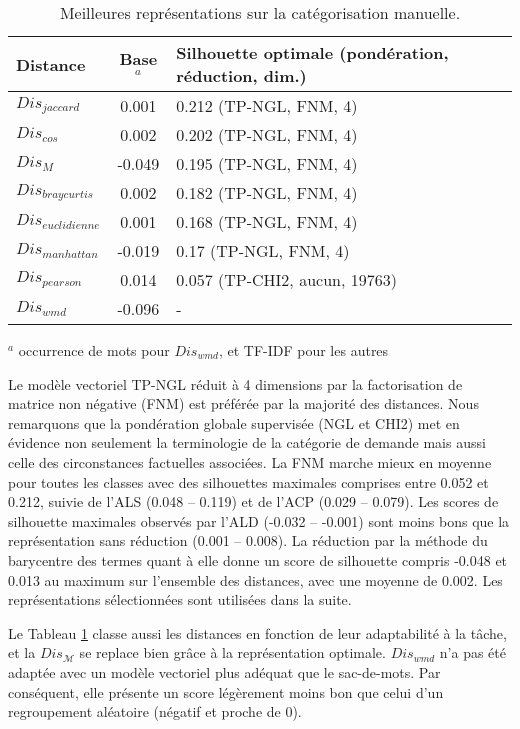 \begin{table}[!htb]
	\scriptsize \centering
	\begin{tabular}[pos]{|l|c|l|}
		\hline
		\textbf{Distance}&\textbf{Base$^a$}&\textbf{Silhouette optimale   (pondération, réduction, dim.)} \\ \hline
		$Dis_{jaccard}$ & 0.001 & 0.212 (TP-NGL, FNM, 4) \\ \hline
		$Dis_{cos}$ & 0.002 & 0.202 (TP-NGL, FNM, 4) \\ \hline
		$Dis_{M}$ & -0.049 & 0.195 (TP-NGL, FNM, 4) \\ \hline
		$Dis_{braycurtis}$ & 0.002& 0.182 (TP-NGL, FNM, 4) \\ \hline
		$Dis_{euclidienne}$ & 0.001& 0.168  (TP-NGL, FNM, 4) \\ \hline
		$Dis_{manhattan}$ & -0.019& 0.17   (TP-NGL, FNM, 4) \\ \hline
		$Dis_{pearson}$ & 0.014 & 0.057 (TP-CHI2, aucun, 19763) \\ \hline
		$Dis_{wmd}$ & -0.096 &  - \\ \hline
	\end{tabular}

	$^a$ occurrence de mots pour $Dis_{wmd}$, et TF-IDF pour les autres
    \caption{Meilleures représentations sur la catégorisation manuelle.} \label{tab:similarite:silhouette-vecteur-manuel}
\end{table}

 
Le modèle vectoriel TP-NGL réduit à 4 dimensions par la factorisation de matrice non négative (FNM) est préférée par la majorité des distances. Nous remarquons que la pondération globale supervisée (NGL et CHI2) met en évidence non seulement la terminologie de la catégorie de demande mais aussi celle des circonstances factuelles associées. La FNM marche mieux en moyenne pour toutes les classes avec des silhouettes maximales comprises entre 0.052 et 0.212, suivie de l'ALS (0.048 -- 0.119) et de l'ACP (0.029 -- 0.079). Les scores de silhouette maximales observés par l'ALD (-0.032 -- -0.001) sont moins bons que la représentation sans réduction (0.001 -- 0.008). La réduction par la méthode du barycentre des termes quant à elle donne un score de silhouette compris -0.048 et 0.013 au maximum sur l'ensemble des distances, avec une moyenne de 0.002.
Les représentations sélectionnées sont utilisées dans la suite. 

Le Tableau \ref{tab:similarite:silhouette-vecteur-manuel} classe aussi les distances en fonction de leur adaptabilité à la tâche, et la $Dis_\mathcal{M}$ se replace bien grâce à la représentation optimale. $Dis_{wmd}$ n'a pas été adaptée avec un modèle vectoriel plus adéquat que le sac-de-mots. Par conséquent, elle présente un score légèrement moins bon que celui d'un regroupement aléatoire (négatif et proche de 0).
